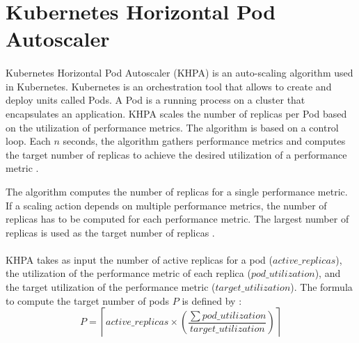 \section{Kubernetes Horizontal Pod Autoscaler}
\label{sec:04_background_khpa}
\paragraph{}
Kubernetes Horizontal Pod Autoscaler (KHPA) is an auto-scaling algorithm used in Kubernetes.
Kubernetes is an orchestration tool that allows to create and deploy units called Pods. A Pod is a running process on a cluster that encapsulates an application.
KHPA scales the number of replicas per Pod based on the utilization of performance metrics.
The algorithm is based on a control loop. Each $n$ seconds, the algorithm gathers performance metrics and computes the target number of replicas to achieve the desired utilization of a performance metric \cite{Casalicchio2017AutoScaleCont}.


The algorithm computes the number of replicas for a single performance metric. If a scaling action depends on multiple performance metrics, the number of replicas has to be computed for each performance metric. The largest number of replicas is used as the target number of replicas \cite{Kubernetes2021Docs}.


\paragraph{}
KHPA takes as input the number of active replicas for a pod ($active\_replicas$), the utilization of the performance metric of each replica ($pod\_utilization$), and the target utilization of the performance metric ($target\_utilization$).
The formula to compute the target number of pods $P$ is defined by \cite{Kubernetes2021Docs}:
\begin{equation}
P = \left \lceil active\_replicas \times \left ( \frac{\sum pod\_utilization}{target\_utilization} \right ) \right \rceil
\label{eq:04_background_khpa_equation}
\end{equation}


